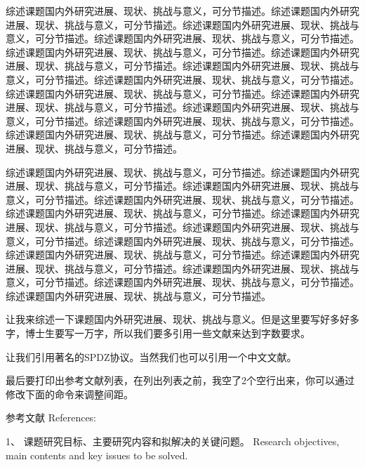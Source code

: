\documentclass[zihao=-4,a4paper,AutoFakeBold]{ctexart}
\newcounter{RequirementCounter}
\newlength{\indentwidth}
\newenvironment{requirement}{%
    \vspace{12pt}%
    \fangsong\bfseries%
    \stepcounter{RequirementCounter}%
    \settowidth{\indentwidth}{\theRequirementCounter 、}
    \begin{hangparas}{\indentwidth}{1}\theRequirementCounter 、}
    {\end{hangparas}}
\newenvironment{content}{\kaishu\setlength{\parskip}{0.5\baselineskip}\linespread{1.75}\selectfont}{}
\begin{document}
\begin{content}

    综述课题国内外研究进展、现状、挑战与意义，可分节描述。综述课题国内外研究进展、现状、挑战与意义，可分节描述。综述课题国内外研究进展、现状、挑战与意义，可分节描述。综述课题国内外研究进展、现状、挑战与意义，可分节描述。综述课题国内外研究进展、现状、挑战与意义，可分节描述。综述课题国内外研究进展、现状、挑战与意义，可分节描述。综述课题国内外研究进展、现状、挑战与意义，可分节描述。综述课题国内外研究进展、现状、挑战与意义，可分节描述。综述课题国内外研究进展、现状、挑战与意义，可分节描述。综述课题国内外研究进展、现状、挑战与意义，可分节描述。综述课题国内外研究进展、现状、挑战与意义，可分节描述。综述课题国内外研究进展、现状、挑战与意义，可分节描述。综述课题国内外研究进展、现状、挑战与意义，可分节描述。综述课题国内外研究进展、现状、挑战与意义，可分节描述。

综述课题国内外研究进展、现状、挑战与意义，可分节描述。综述课题国内外研究进展、现状、挑战与意义，可分节描述。综述课题国内外研究进展、现状、挑战与意义，可分节描述。综述课题国内外研究进展、现状、挑战与意义，可分节描述。综述课题国内外研究进展、现状、挑战与意义，可分节描述。综述课题国内外研究进展、现状、挑战与意义，可分节描述。综述课题国内外研究进展、现状、挑战与意义，可分节描述。综述课题国内外研究进展、现状、挑战与意义，可分节描述。综述课题国内外研究进展、现状、挑战与意义，可分节描述。综述课题国内外研究进展、现状、挑战与意义，可分节描述。综述课题国内外研究进展、现状、挑战与意义，可分节描述。综述课题国内外研究进展、现状、挑战与意义，可分节描述。综述课题国内外研究进展、现状、挑战与意义，可分节描述。


    让我来综述一下课题国内外研究进展、现状、挑战与意义。但是这里要写好多好多字，博士生要写一万字，所以我们要多引用一些文献来达到字数要求。

    让我们引用著名的SPDZ协议\cite{SPDZ}。当然我们也可以引用一个中文文献\cite{ZJSD}。

    最后要打印出参考文献列表，在列出列表之前，我空了2个空行出来，你可以通过修改下面的命令来调整间距。

    \vspace{2\baselineskip}
    \linespread{1.25}\selectfont %
    参考文献 References: 
    \printbibliography[heading=none]
\end{content}


\begin{requirement}
    课题研究目标、主要研究内容和拟解决的关键问题。 
    Research objectives, main contents and key issues to be solved.
\end{requirement}
\end{document}
